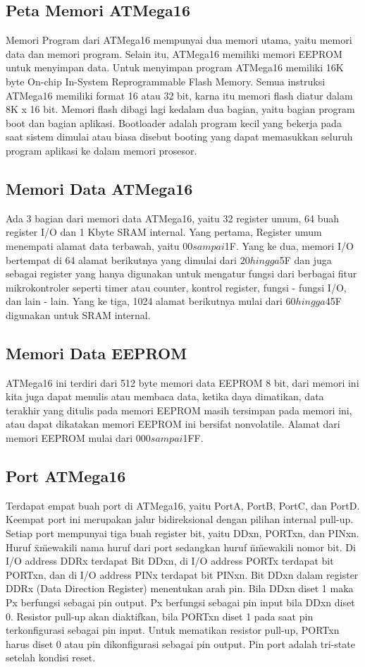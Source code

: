 	\subsection{Peta Memori ATMega16}
		Memori Program dari ATMega16 mempunyai dua memori utama, yaitu memori data dan memori program. Selain itu, ATMega16 memiliki memori EEPROM untuk menyimpan data. Untuk menyimpan program ATMega16 memiliki 16K byte On-chip In-System Reprogrammable Flash Memory. Semua instruksi ATMega16 memiliki format 16 atau 32 bit, karna itu memori flash diatur dalam 8K x 16 bit. Memori flash dibagi lagi kedalam dua bagian, yaitu bagian program boot dan bagian aplikasi. Bootloader adalah program kecil yang bekerja pada saat sistem dimulai atau biasa disebut booting yang dapat memasukkan seluruh program aplikasi ke dalam memori prosesor.
	\subsection{Memori Data ATMega16}
		 Ada 3 bagian dari memori data ATMega16, yaitu 32 register umum, 64 buah register I/O dan 1 Kbyte SRAM internal. Yang pertama, Register umum menempati alamat data terbawah, yaitu $00 sampai $1F. Yang ke dua, memori I/O bertempat di 64 alamat berikutnya yang dimulai dari $20 hingga $5F dan juga sebagai register yang hanya digunakan untuk mengatur fungsi dari berbagai fitur mikrokontroler seperti timer atau counter, kontrol register, fungsi - fungsi I/O, dan lain - lain.  Yang ke tiga, 1024 alamat berikutnya mulai dari $60 hingga $45F digunakan untuk SRAM internal.
	\subsection{Memori Data EEPROM}
		ATMega16 ini terdiri dari 512 byte memori data EEPROM 8 bit, dari memori ini kita juga dapat menulis atau membaca data, ketika daya dimatikan, data terakhir yang ditulis pada memori EEPROM masih tersimpan pada memori ini, atau dapat dikatakan memori EEPROM ini bersifat nonvolatile. Alamat dari memori EEPROM mulai dari $000 sampai $1FF.
	\subsection{Port ATMega16}
		Terdapat empat buah port di ATMega16, yaitu PortA, PortB, PortC, dan PortD. Keempat port ini merupakan jalur  bidireksional dengan pilihan  internal pull-up. Setiap port mempunyai tiga buah register bit, yaitu DDxn, PORTxn, dan PINxn. Huruf \"x\" mewakili nama huruf dari port sedangkan huruf \"n\" mewakili nomor bit. Di I/O address DDRx terdapat Bit DDxn, di I/O address PORTx terdapat bit PORTxn, dan di I/O address PINx terdapat bit PINxn. Bit DDxn dalam register DDRx (Data Direction Register) menentukan arah pin. Bila DDxn diset 1 maka  Px berfungsi sebagai pin output. Px berfungsi sebagai pin input bila DDxn diset 0. Resistor pull-up akan diaktifkan, bila PORTxn diset 1 pada saat pin terkonfigurasi sebagai pin input. Untuk mematikan resistor  pull-up, PORTxn harus diset 0 atau pin dikonfigurasi sebagai pin output. Pin port adalah  tri-state setelah kondisi reset.

